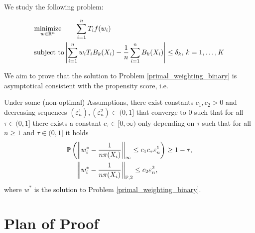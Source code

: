 We study the following problem:

\begin{align}
  \label{primal_weighting_binary}
  \begin{split}
    &\underset{w \in \mathbb{R}^n}{\text{minimize}}
    \qquad
    \sum_{i = 1}^{n} T_i f(w_i)
\\
    &\text{subject to}
    \left| 
      \sum_{i = 1}^{n} w_i T_i B_k(X_i)
      - 
      \frac{1}{n} \sum_{i = 1}^{n} B_k(X_i)
    \right|
    \le 
    \delta_k,\,
    k = 1, \ldots, K
  \end{split}
\end{align}

We aim to prove that the solution to 
Problem \eqref{primal_weighting_binary}
is asymptotical consistent with the propensity score, i.e.

\begin{theorem}
  \label{ch_theorem_1}
  Under some (non-optimal) Assumptions,
  there exist constants
  $
    c_{1}
    , 
    c_{2}
    >
    0
  $
  and decreasing sequences
  $
    (\varepsilon_n^1)
    ,
    (\varepsilon_n^2)
    \subset
    (0,1]
  $
  that converge to 0
  such that
  for all
  $
    \tau
    \in
    (0,1]
  $
  there exists a constant
  $
    c_{\tau}
    \in
    [0,\infty)
  $
  only depending on 
  $ \tau $
  such that for all 
  $ n \ge 1 $
  and
  $
    \tau
    \in
    (0,1]
  $
  it holds
  \begin{align}
    \label{ch_theorem_1_alternative}
    \begin{split}
   & \mathbb{P}
    \left( 
  \left\lVert
    w^*_i
    -
    \frac{1}{n \pi(X_i)}
  \right\rVert_\infty
  \le 
  c_{1}
  c_{\tau}
  \varepsilon_{n}^1 
   \right)
   \ge
  1 - \tau
  ,
\\
   &\quad \
   \left\lVert
    w^*_i
    -
    \frac{1}{n \pi(X_i)}
  \right\rVert_{\mathbb{P}, 2}
  \le 
  c_{2}
  \varepsilon_n^{2},
      \end{split}
  \end{align}
  where 
  $w^*$
  is the solution to 
  Problem \eqref{primal_weighting_binary}.
\end{theorem}

\section*{Plan of Proof}

